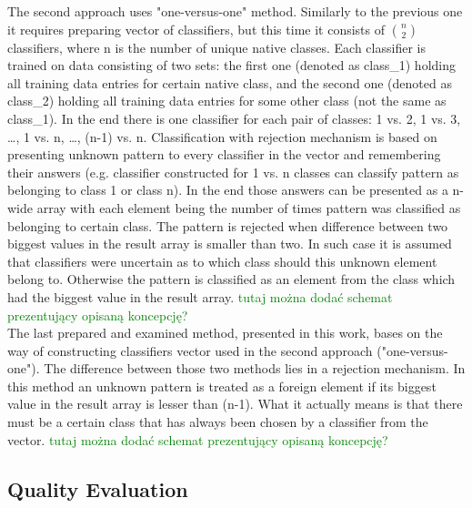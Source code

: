 \documentclass{llncs}
\begin{document}
The second approach uses "one-versus-one" method. Similarly to the previous one it requires preparing vector of classifiers, but this time it consists of ${n}\choose{2}$ classifiers, where n is the number of unique native classes. Each classifier is trained on data consisting of two sets: the first one (denoted as class\_1) holding all training data entries for certain native class, and the second one (denoted as class\_2) holding all training data entries for some other class (not the same as class\_1). In the end there is one classifier for each pair of classes: 1 vs. 2, 1 vs. 3, \dots, 1 vs. n, \dots, (n-1) vs. n. Classification with rejection mechanism is based on presenting unknown pattern to every classifier in the vector and remembering their answers (e.g. classifier constructed for 1 vs. n classes can classify pattern as belonging to class 1 or class n). In the end those answers can be presented as a n-wide array with each element being the number of times pattern was classified as belonging to certain class. The pattern is rejected when difference between two biggest values in the result array is smaller than two. In such case it is assumed that classifiers were uncertain as to which class should this unknown element belong to. Otherwise the pattern is classified as an element from the class which had the biggest value in the result array. \textcolor{green}{tutaj można dodać schemat prezentujący opisaną koncepcję?} \\

The last prepared and examined method, presented in this work, bases on the way of constructing classifiers vector used in the second approach ("one-versus-one"). The difference between those two methods lies in a rejection mechanism. In this method an unknown pattern is treated as a foreign element if its biggest value in the result array is lesser than (n-1). What it actually means is that there must be a certain class that has always been chosen by a classifier from the vector. \textcolor{green}{tutaj można dodać schemat prezentujący opisaną koncepcję?} \\




\subsection{Quality Evaluation}
\end{document}
